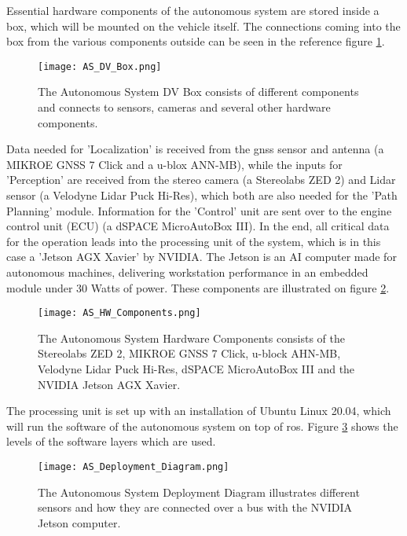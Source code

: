 Essential hardware components of the autonomous system are stored inside a box, which will be mounted on the vehicle itself. The connections coming into the box from the various components outside can be seen in the reference figure \ref{fig:AS DV Box}. 

\begin{figure}[H]
    \centering
    \texttt{[image: AS\_DV\_Box.png]}
    \caption{The Autonomous System DV Box consists of different components and connects to sensors, cameras and several other hardware components.}
    \label{fig:AS DV Box}
\end{figure}

Data needed for 'Localization' is received from the \acrshort{gnss} sensor and antenna (a MIKROE GNSS 7 Click and a u-blox ANN-MB), while the inputs for 'Perception' are received from the stereo camera (a Stereolabs ZED 2) and Lidar sensor (a Velodyne Lidar Puck Hi-Res), which both are also needed for the 'Path Planning' module. Information for the 'Control' unit are sent over to the engine control unit (ECU) (a dSPACE MicroAutoBox III). In the end, all critical data for the operation leads into the processing unit of the system, which is in this case a 'Jetson AGX Xavier' by NVIDIA. The Jetson is an AI computer made for autonomous machines, delivering workstation performance in an embedded module under 30 Watts of power. These components are illustrated on figure \ref{fig:AS HW Components}.
\begin{figure}[H]
    \centering
    \texttt{[image: AS\_HW\_Components.png]}
    \caption{The Autonomous System Hardware Components consists of the Stereolabs ZED 2, MIKROE GNSS 7 Click, u-block AHN-MB, Velodyne Lidar Puck Hi-Res, dSPACE MicroAutoBox III and the NVIDIA Jetson AGX Xavier.}
    \label{fig:AS HW Components}
\end{figure}

The processing unit is set up with an installation of Ubuntu Linux 20.04, which will run the software of the autonomous system on top of \acrshort{ros}. Figure \ref{fig:AS Deployment Diagram} shows the levels of the software layers which are used.
\begin{figure}[H]
    \centering
    \texttt{[image: AS\_Deployment\_Diagram.png]}
    \caption{The Autonomous System Deployment Diagram illustrates different sensors and how they are connected over a bus with the NVIDIA Jetson computer.}
    \label{fig:AS Deployment Diagram}
\end{figure}

